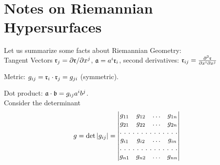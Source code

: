  \section{Notes on Riemannian Hypersurfaces}
 
 Let us summarize some facts about Riemannian Geometry:\\
 
Tangent Vectors $\mathfrak{r}_j= \partial\mathfrak{r}/\partial x^j $, $\mathfrak{a} = a^i\mathfrak{r}_i$, second derivatives: $\mathfrak{r}_{ij} = {\partial^2 \mathfrak{r}\over \partial x^i\partial x^j}$

Metric: $g_{ij}= \mathfrak{r}_i\cdot\mathfrak{r}_j = g_{ji}$ (symmetric).

Dot product: $\mathfrak{a}\cdot\mathfrak{b}= g_{ij} a^ib^j$.\\

Consider the determinant 
\begin{equation}
g = \det \left| \gij \right| =
\begin{vmatrix}
g_{11} & g_{12}  & \hdots & g_{1n}  \\
g_{21} & g_{22}  & \hdots & g_{2n}  \\
\hdotsfor[2]{4}\\
g_{i1} & g_{i2}  & \hdots & g_{in}  \\
\hdotsfor[2]{4}\\
g_{n1} & g_{n2}  & \hdots & g_{nn}  \\
\end{vmatrix}
\end{equation}







